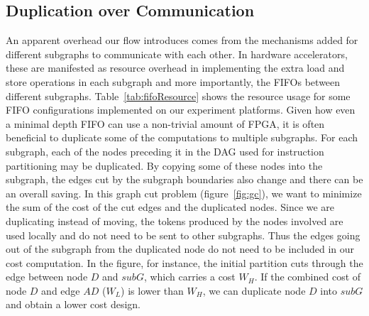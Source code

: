 \subsection{Duplication over Communication}
\label{dupvscomm}
An apparent overhead our flow introduces comes from the mechanisms added
for different subgraphs to communicate with each other. In hardware accelerators,
these are manifested as resource overhead in implementing the extra load and
store operations in each subgraph and more importantly, the FIFOs
between different subgraphs. Table~\ref{tab:fifoResource} shows the
resource usage for some FIFO configurations implemented on our experiment platforms. Given how even a minimal depth FIFO 
can use a non-trivial amount of FPGA, it is often beneficial to duplicate some of the computations to multiple subgraphs.
For each subgraph, each of the nodes preceding it in the DAG used for
instruction partitioning may be duplicated. By copying some of
these nodes into the subgraph, the edges cut by the subgraph boundaries
also change and there can be an overall saving. 
In this graph cut problem (figure~\ref{fig:gc}), we want to minimize the sum of the cost of the cut edges
and the duplicated nodes.  Since we are duplicating instead
of moving, the tokens produced by the nodes involved are used locally and do
not need to be sent to other subgraphs.
Thus the edges going out of the subgraph from the duplicated node do not need to be included in our cost computation. In the figure, for instance,
the initial partition  cuts through the edge between
node $D$ and $subG$, which carries a cost $W_H$. If the combined cost of node $D$ and edge $AD$ ($W_L$) is lower than $W_H$, we can duplicate node $D$ into
$subG$ and obtain a lower cost design.


